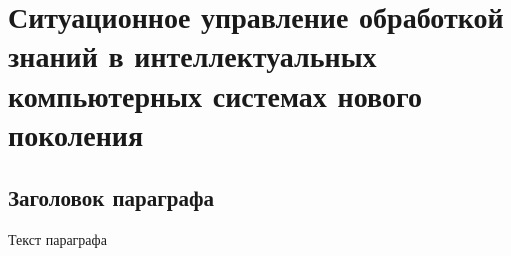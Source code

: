 
\chapter{Ситуационное управление обработкой знаний в интеллектуальных компьютерных системах нового поколения}
\label{chapter_situation_management}


\section{Заголовок параграфа}
Текст параграфа

%